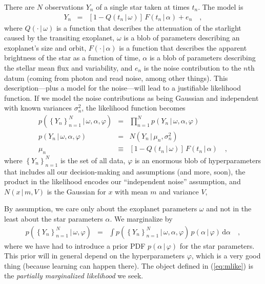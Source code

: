 \documentclass[12pt,letterpaper]{article}
\newcommand{\dd}{\mathrm{d}}
\newcommand{\given}{\,|\,}
\newcommand{\setof}[1]{\left\{{#1}\right\}}
\newcommand{\datum}{Y}
\newcommand{\data}{\setof{\datum_n}_{n=1}^N}
\renewcommand{\time}{t}
\newcommand{\exofn}{Q}
\newcommand{\exopars}{\omega}
\newcommand{\flux}{F}
\newcommand{\starpars}{\alpha}
\newcommand{\noise}{e}
\newcommand{\variance}{\sigma^2}
\newcommand{\hyperpars}{\varphi}
\newcommand{\normal}{N}
\newcommand{\mean}{\mu}
\begin{document}
There are $N$ observations $\datum_n$ of a single star taken at times $\time_n$.
The model is
\begin{eqnarray}
\datum_n &=& [1 - \exofn(t_n\given\exopars)]\,\flux(t_n\given\starpars) + \noise_n
\quad ,
\end{eqnarray}
where
$\exofn(\cdot\given\exopars)$ is a function
that describes the attenuation of the starlight caused by the transiting exoplanet,
$\exopars$ is a blob of parameters describing an exoplanet's size and orbit,
$\flux(\cdot\given\starpars)$ is a function
that describes the apparent brightness of the star as a function of time,
$\starpars$ is a blob of parameters describing the stellar mean flux and variability,
and $\noise_n$ is the noise contribution to the $n$th datum
(coming from photon and read noise, among other things).
This description---plus a model for the noise---will lead to a justifiable likelihood function.
If we model the noise contributions as being Gaussian and independent
with known variances $\variance_n$, the likelihood function becomes
\begin{eqnarray}
p(\data\given\exopars,\starpars,\hyperpars)
  &=& \prod_{n=1}^N p(\datum_n\given\exopars,\starpars,\hyperpars)
\label{eq:like}
\\
p(\datum_n\given\exopars,\starpars,\hyperpars)
  &=& \normal(\datum_n\given\mean_n,\variance_n)
\\
\mean_n
  &\equiv& [1 - \exofn(t_n\given\exopars)]\,\flux(t_n\given\starpars)
\quad ,
\end{eqnarray}
where
$\data$ is the set of all data,
$\hyperpars$ is an enormous blob of hyperparameters
that includes all our decision-making and assumptions (and more, soon),
the product in the likelihood encodes our ``independent noise'' assumption,
and $\normal(x\given m,V)$ is the Gaussian for $x$ with mean $m$ and variance $V$,

By assumption, we care only about the exoplanet parameters $\exopars$
and not in the least about the star parameters $\starpars$.
We marginalize by
\begin{eqnarray}
p(\data\given\exopars,\hyperpars)
  &=& \int p(\data\given\exopars,\starpars,\hyperpars)\,p(\starpars\given\hyperpars)\,\dd\starpars
\label{eq:mlike}
\quad ,
\end{eqnarray}
where
we have had to introduce a prior PDF $p(\starpars\given\hyperpars)$ for the star parameters.
This prior will in general depend on the hyperparameters $\hyperpars$,
which is a very good thing (because learning can happen there).
The object defined in (\ref{eq:mlike}) is the \emph{partially marginalized likelihood}
we seek.
\end{document}
